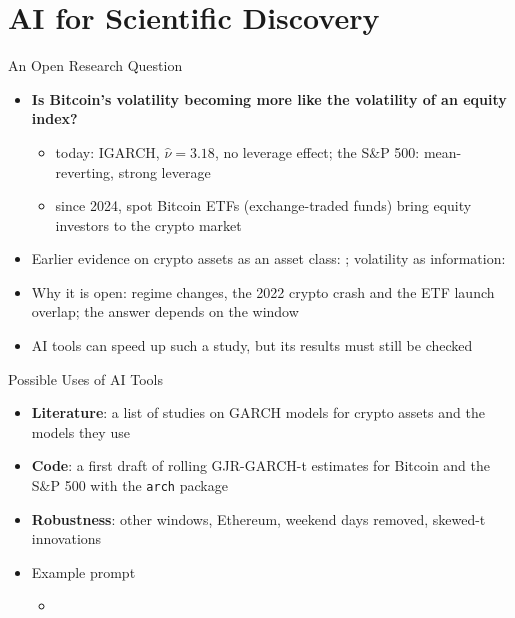 \section{AI for Scientific Discovery}

\begin{frame}{An Open Research Question}
\itemsize{\small}
\begin{itemize}
    \item \textbf{Is Bitcoin's volatility becoming more like the volatility of an equity index?}
    \begin{itemize}
        \item today: IGARCH, $\hat\nu = 3.18$, no leverage effect; the S\&P 500: mean-reverting, strong leverage
        \item since 2024, spot Bitcoin ETFs (exchange-traded funds) bring equity investors to the crypto market
    \end{itemize}
    \item Earlier evidence on crypto assets as an asset class: ; volatility as information: 
    \item Why it is open: regime changes, the 2022 crypto crash and the ETF launch overlap; the answer depends on the window
    \item AI tools can speed up such a study, but its results must still be checked 
\end{itemize}
\end{frame}

\begin{frame}{Possible Uses of AI Tools}
\itemsize{\small}
\begin{itemize}
    \item \textbf{Literature}: a list of studies on GARCH models for crypto assets and the models they use
    \item \textbf{Code}: a first draft of rolling GJR-GARCH-t estimates for Bitcoin and the S\&P 500 with the \texttt{arch} package
    \item \textbf{Robustness}: other windows, Ethereum, weekend days removed, skewed-t innovations
    \item Example prompt
    \begin{itemize}
        \item {}
    \end{itemize}
\end{itemize}
\end{frame}

